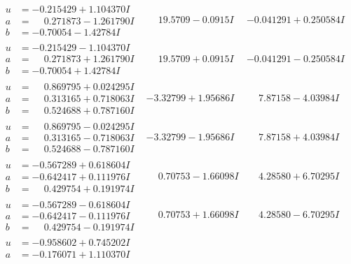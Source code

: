 \documentclass[1p]{elsarticle_modified}
\theoremstyle{definition}
\begin{document}
$$\begin{array}{c|c|c}
\begin{aligned}
u &= -0.215429 + 1.104370 I \\
a &= \phantom{-}0.271873 - 1.261790 I \\
b &= -0.70054 - 1.42784 I\end{aligned}
 & \phantom{-}19.5709 - 0.0915 I & -0.041291 + 0.250584 I \\ \hline\begin{aligned}
u &= -0.215429 - 1.104370 I \\
a &= \phantom{-}0.271873 + 1.261790 I \\
b &= -0.70054 + 1.42784 I\end{aligned}
 & \phantom{-}19.5709 + 0.0915 I & -0.041291 - 0.250584 I \\ \hline\begin{aligned}
u &= \phantom{-}0.869795 + 0.024295 I \\
a &= \phantom{-}0.313165 + 0.718063 I \\
b &= \phantom{-}0.524688 + 0.787160 I\end{aligned}
 & -3.32799 + 1.95686 I & \phantom{-}7.87158 - 4.03984 I \\ \hline\begin{aligned}
u &= \phantom{-}0.869795 - 0.024295 I \\
a &= \phantom{-}0.313165 - 0.718063 I \\
b &= \phantom{-}0.524688 - 0.787160 I\end{aligned}
 & -3.32799 - 1.95686 I & \phantom{-}7.87158 + 4.03984 I \\ \hline\begin{aligned}
u &= -0.567289 + 0.618604 I \\
a &= -0.642417 + 0.111976 I \\
b &= \phantom{-}0.429754 + 0.191974 I\end{aligned}
 & \phantom{-}0.70753 - 1.66098 I & \phantom{-}4.28580 + 6.70295 I \\ \hline\begin{aligned}
u &= -0.567289 - 0.618604 I \\
a &= -0.642417 - 0.111976 I \\
b &= \phantom{-}0.429754 - 0.191974 I\end{aligned}
 & \phantom{-}0.70753 + 1.66098 I & \phantom{-}4.28580 - 6.70295 I \\ \hline\begin{aligned}
u &= -0.958602 + 0.745202 I \\
a &= -0.176071 + 1.110370 I \\

\end{aligned}
\end{array}$$
\end{document}
